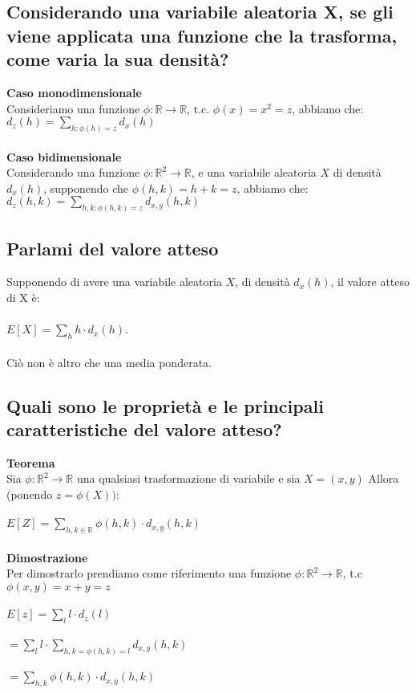 \documentclass[a4paper,12pt]{report}
\begin{document}
	\subsection{Considerando una variabile aleatoria X, se gli viene applicata una funzione che la trasforma, come varia la sua densità?}
	\textbf{Caso monodimensionale} \\
	Consideriamo una funzione $\phi : \mathbb{R} \rightarrow \mathbb{R}$, t.c. $\phi(x) = x^2 = z$, abbiamo che:\\
	$d_z(h) = \sum_{h :\phi(h) = z}d_x(h)$  \\\\
	\textbf{Caso bidimensionale} \\
	Considerando una funzione $\phi : \mathbb{R}^2 \rightarrow \mathbb{R}$,  e una variabile aleatoria $X$ di densità $d_x(h)$, supponendo che $\phi(h, k) = h + k = z$, abbiamo che: \\
	$d_{z}(h, k) = \sum_{h, k : \phi(h, k) = z}d_{x, y}(h, k)$
	\subsection{Parlami del valore atteso}
	Supponendo di avere una variabile aleatoria $X$, di densità $d_x(h)$, il valore atteso di X è: \\\\
	$E[X] = \sum_{h} h \cdot d_x(h)$. \\ \\
	Ciò non è altro che una media ponderata.
	\newpage
	\subsection{Quali sono le proprietà e le principali caratteristiche del valore atteso?}
	\textbf{Teorema}\\
	Sia $\phi: \mathbb{R}^2 \rightarrow \mathbb{R}$ una qualsiasi trasformazione di variabile e sia $X = (x, y)$ Allora (ponendo $z = \phi(X)):$ \\ \\
	$E[Z] = \sum_{h, k \in \mathbb{R}} \phi(h, k) \cdot d_{x, y}(h, k)$ \\ \\
	\textbf{Dimostrazione} \\
	Per dimostrarlo prendiamo come riferimento una funzione $\phi : \mathbb{R}^2 \rightarrow \mathbb{R}$, t.c $\phi(x, y) = x + y = z$ \\ \\
	$E[z] = \sum_{l} l \cdot d_z(l)$ \\\\
	$= \sum_{l}l \cdot \sum_{h, k = \phi(h, k) = l} d_{x, y}(h, k)$ \\\\
	$= \sum_{h, k} \phi(h, k) \cdot d_{x,y}(h, k)$ 
	\newpage
	
\end{document}
